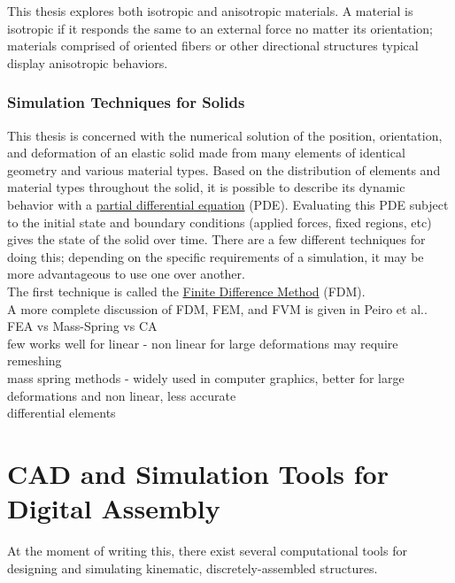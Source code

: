 {This thesis explores both isotropic and anisotropic materials.  A material is isotropic if it responds the same to an external force no matter its orientation; materials comprised of oriented fibers or other directional structures typical display anisotropic behaviors.  

\subsubsection{Simulation Techniques for Solids}

This thesis is concerned with the numerical solution of the position, orientation, and deformation of an elastic solid made from many elements of identical geometry and various material types.  Based on the distribution of elements and material types throughout the solid, it is possible to describe its dynamic behavior with a \href{https://en.wikipedia.org/wiki/Partial_differential_equation}{partial differential equation} (PDE).  Evaluating this PDE subject to the initial state and boundary conditions (applied forces, fixed regions, etc) gives the state of the solid over time.  There are a few different techniques for doing this; depending on the specific requirements of a simulation, it may be more advantageous to use one over another.\\

The first technique is called the \href{https://en.wikipedia.org/wiki/Finite_difference_method}{Finite Difference Method} (FDM).  \\


A more complete discussion of FDM, FEM, and FVM is given in Peiro et al.\cite{Peiro2005}.\\

FEA vs Mass-Spring vs CA\\
few works well for linear - non linear for large deformations may require remeshing\\
mass spring methods - widely used in computer graphics, better for large deformations and non linear, less accurate\\
differential elements\\


\section{CAD and Simulation Tools for Digital Assembly}

At the moment of writing this, there exist several computational tools for designing and simulating kinematic, discretely-assembled structures.

}
